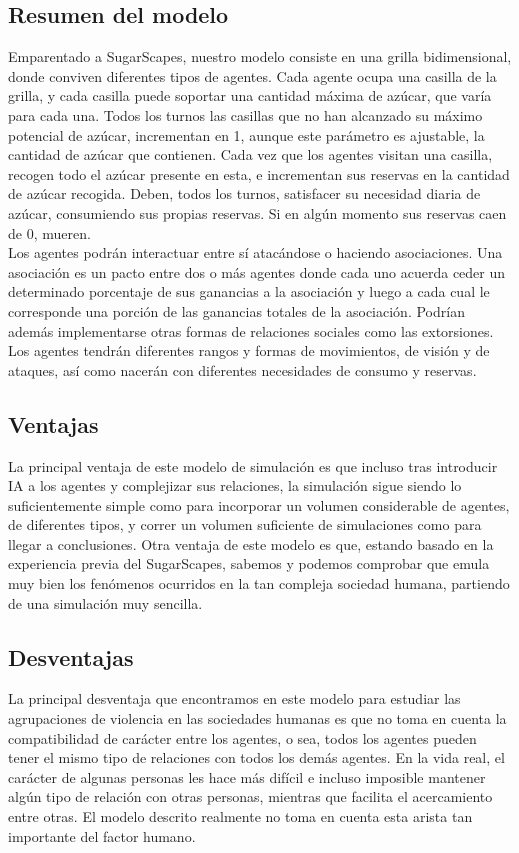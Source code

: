 \documentclass[11pt]{article}
\begin{document}
\subsection{Resumen del modelo}
Emparentado a SugarScapes, nuestro modelo consiste en una grilla bidimensional, donde conviven diferentes tipos de agentes. Cada agente ocupa una casilla de la grilla, y cada casilla puede soportar una cantidad máxima de azúcar, que varía para cada una. Todos los turnos las casillas que no han alcanzado su máximo potencial de azúcar, incrementan en 1, aunque este parámetro es ajustable, la cantidad de azúcar que contienen. Cada vez que los agentes visitan una casilla, recogen todo el azúcar presente en esta, e incrementan sus reservas en la cantidad de azúcar recogida. Deben, todos los turnos, satisfacer su necesidad diaria de azúcar, consumiendo sus propias reservas. Si en algún momento sus reservas caen de 0, mueren.\\
Los agentes podrán interactuar entre sí atacándose o haciendo asociaciones. Una asociación es un pacto entre dos o más agentes donde cada uno acuerda ceder un determinado porcentaje de sus ganancias a la asociación y luego a cada cual le corresponde una porción de las ganancias totales de la asociación. Podrían además implementarse otras formas de relaciones sociales como las extorsiones.\\
Los agentes tendrán diferentes rangos y formas de movimientos, de visión y de ataques, así como nacerán con diferentes necesidades de consumo y reservas.\\
\subsection{Ventajas}
La principal ventaja de este modelo de simulación es que incluso tras introducir IA a los agentes y complejizar sus relaciones, la simulación sigue siendo lo suficientemente simple como para incorporar un volumen considerable de agentes, de diferentes tipos, y correr un volumen suficiente de simulaciones como para llegar a conclusiones. Otra ventaja de este modelo es que, estando basado en la experiencia previa del SugarScapes, sabemos y podemos comprobar que emula muy bien los fenómenos ocurridos en la tan compleja sociedad humana, partiendo de una simulación muy sencilla.\\
\subsection{Desventajas}
La principal desventaja que encontramos en este modelo para estudiar las agrupaciones de violencia en las sociedades humanas es que no toma en cuenta la compatibilidad de carácter entre los agentes, o sea, todos los agentes pueden tener el mismo tipo de relaciones con todos los demás agentes. En la vida real, el carácter de algunas personas les hace más difícil e incluso imposible mantener algún tipo de relación con otras personas, mientras que facilita el acercamiento entre otras. El modelo descrito realmente no toma en cuenta esta arista tan importante del factor humano.\\
\end{document}
